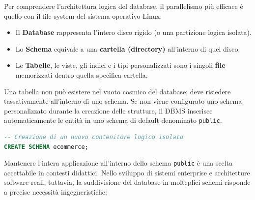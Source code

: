Per comprendere l'architettura logica del database, il parallelismo più efficace è quello con il file system del sistema operativo Linux:
\begin{itemize}
    \item Il \textbf{Database} rappresenta l'intero disco rigido (o una partizione logica isolata).
    \item Lo \textbf{Schema} equivale a una \textbf{cartella (directory)} all'interno di quel disco.
    \item Le \textbf{Tabelle}, le viste, gli indici e i tipi personalizzati sono i singoli \textbf{file} memorizzati dentro quella specifica cartella.
\end{itemize}

Una tabella non può esistere nel vuoto cosmico del database; deve risiedere tassativamente all'interno di uno schema. Se non viene configurato uno schema personalizzato durante la creazione delle strutture, il DBMS inserisce automaticamente le entità in uno schema di default denominato \texttt{public}.

\begin{lstlisting}[language=SQL, title=Sintassi di Creazione di uno Schema]
-- Creazione di un nuovo contenitore logico isolato
CREATE SCHEMA ecommerce;
\end{lstlisting}

Mantenere l'intera applicazione all'interno dello schema \texttt{public} è una scelta accettabile in contesti didattici. Nello sviluppo di sistemi enterprise e architetture software reali, tuttavia, la suddivisione del database in molteplici schemi risponde a precise necessità ingegneristiche:

